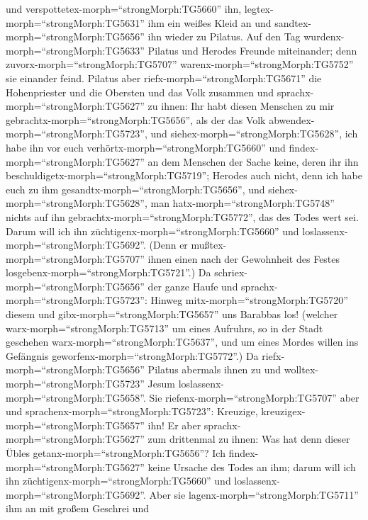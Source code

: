 und verspottetex-morph=``strongMorph:TG5660'' ihn,
legtex-morph=``strongMorph:TG5631'' ihm ein weißes Kleid an und
sandtex-morph=``strongMorph:TG5656'' ihn wieder zu Pilatus.
 Auf den Tag wurdenx-morph=``strongMorph:TG5633'' Pilatus
und Herodes Freunde miteinander; denn
zuvorx-morph=``strongMorph:TG5707'' warenx-morph=``strongMorph:TG5752''
sie einander feind.  Pilatus aber
riefx-morph=``strongMorph:TG5671'' die Hohenpriester und die Obersten
und das Volk zusammen  und
sprachx-morph=``strongMorph:TG5627'' zu ihnen: Ihr habt diesen Menschen
zu mir gebrachtx-morph=``strongMorph:TG5656'', als der das Volk
abwendex-morph=``strongMorph:TG5723'', und
siehex-morph=``strongMorph:TG5628'', ich habe ihn vor euch
verhörtx-morph=``strongMorph:TG5660'' und
findex-morph=``strongMorph:TG5627'' an dem Menschen der Sache keine,
deren ihr ihn beschuldigetx-morph=``strongMorph:TG5719''; 
Herodes auch nicht, denn ich habe euch zu ihm
gesandtx-morph=``strongMorph:TG5656'', und
siehex-morph=``strongMorph:TG5628'', man
hatx-morph=``strongMorph:TG5748'' nichts auf ihn
gebrachtx-morph=``strongMorph:TG5772'', das des Todes wert sei.
 Darum will ich ihn züchtigenx-morph=``strongMorph:TG5660''
und loslassenx-morph=``strongMorph:TG5692''.  (Denn er
mußtex-morph=``strongMorph:TG5707'' ihnen einen nach der Gewohnheit des
Festes losgebenx-morph=``strongMorph:TG5721''.)  Da
schriex-morph=``strongMorph:TG5656'' der ganze Haufe und
sprachx-morph=``strongMorph:TG5723'': Hinweg
mitx-morph=``strongMorph:TG5720'' diesem und
gibx-morph=``strongMorph:TG5657'' uns Barabbas los! 
(welcher warx-morph=``strongMorph:TG5713'' um eines Aufruhrs, so in der
Stadt geschehen warx-morph=``strongMorph:TG5637'', und um eines Mordes
willen ins Gefängnis geworfenx-morph=``strongMorph:TG5772''.)
 Da riefx-morph=``strongMorph:TG5656'' Pilatus abermals
ihnen zu und wolltex-morph=``strongMorph:TG5723'' Jesum
loslassenx-morph=``strongMorph:TG5658''.  Sie
riefenx-morph=``strongMorph:TG5707'' aber und
sprachenx-morph=``strongMorph:TG5723'': Kreuzige,
kreuzigex-morph=``strongMorph:TG5657'' ihn!  Er aber
sprachx-morph=``strongMorph:TG5627'' zum drittenmal zu ihnen: Was hat
denn dieser Übles getanx-morph=``strongMorph:TG5656''? Ich
findex-morph=``strongMorph:TG5627'' keine Ursache des Todes an ihm;
darum will ich ihn züchtigenx-morph=``strongMorph:TG5660'' und
loslassenx-morph=``strongMorph:TG5692''.  Aber sie
lagenx-morph=``strongMorph:TG5711'' ihm an mit großem Geschrei und
